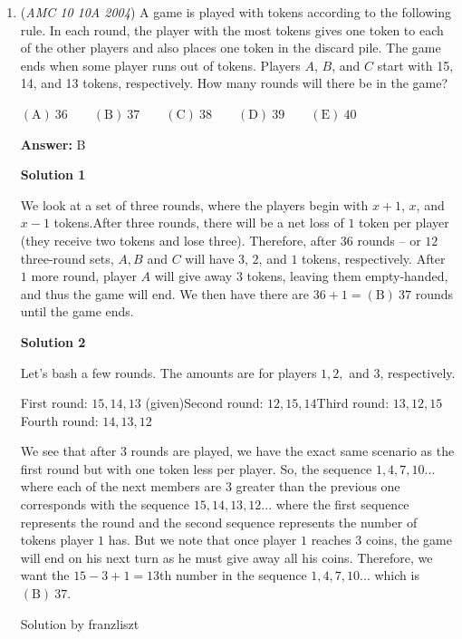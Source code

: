 \begin{enumerate}
	\item (\textit{AMC 10 10A 2004}) A game is played with tokens according to the following rule.  In each round, the player with the most tokens gives one token to each of the other players and also places one token in the discard pile.  The game ends when some player runs out of tokens.  Players $A$, $B$, and $C$ start with 15, 14, and 13 tokens, respectively.  How many rounds will there be in the game?


 $\mathrm{(A) \ } 36 \qquad \mathrm{(B) \ } 37 \qquad \mathrm{(C) \ } 38 \qquad \mathrm{(D) \ } 39 \qquad \mathrm{(E) \ } 40$

 \textbf{Answer: }B



\textbf{Solution 1}

We look at a set of three rounds, where the players begin with $x+1$, $x$, and $x-1$ tokens.After three rounds, there will be a net loss of $1$ token per player (they receive two tokens and lose three). Therefore, after $36$ rounds -- or $12$ three-round sets, $A,B$ and $C$ will have $3$, $2$, and $1$ tokens, respectively.  After $1$ more round, player $A$ will give away $3$ tokens, leaving them empty-handed, and thus the game will end. We then have there are $36+1=\boxed{\mathrm{(B)}\ 37}$ rounds until the game ends.

 



\textbf{Solution 2}

Let's bash a few rounds. The amounts are for players $1,2,$ and $3$, respectively.

 First round: $15,14,13$ (given)Second round: $12,15,14$Third round: $13,12,15$Fourth round: $14,13,12$

 We see that after $3$ rounds are played, we have the exact same scenario as the first round but with one token less per player. So, the sequence $1,4,7,10...$ where each of the next members are $3$ greater than the previous one corresponds with the sequence $15,14,13,12...$ where the first sequence represents the round and the second sequence represents the number of tokens player $1$ has. But we note that once player $1$ reaches $3$ coins, the game will end on his next turn as he must give away all his coins. Therefore, we want the $15-3+1=13$th number in the sequence $1,4,7,10...$ which is $\boxed{\mathrm{(B)}\ 37}$.

 Solution by franzliszt

 




\end{enumerate}
